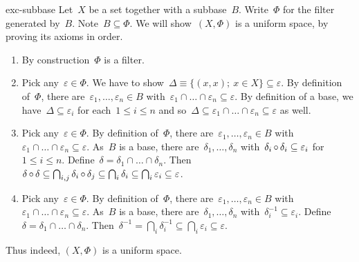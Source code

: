 \begin{solution}{exc-subbase}%
    Let~$X$ be a set together with a subbase~$B$.
    Write~$\Phi$ for the filter generated by~$B$.
    Note~$B \subseteq \Phi$.
    We will show~$(X,\Phi)$ is a uniform space, by proving
        its axioms in order.
\begin{enumerate}
    \item
        By construction~$\Phi$ is a filter.
    \item
        Pick any~$\varepsilon \in \Phi$.
        We have to show~$\Delta\equiv\{(x,x); \ x\in X\} \subseteq \varepsilon$.
        By definition of~$\Phi$, there
        are~$\varepsilon_1, \ldots, \varepsilon_n \in B$
        with~$\varepsilon_1 \cap \ldots \cap \varepsilon_n \subseteq \varepsilon$.
    By definition of a base, we have~$\Delta \subseteq \varepsilon_i$
        for each~$1 \leq i \leq n$
        and so~$\Delta \subseteq \varepsilon_1 \cap \ldots
        \cap \varepsilon_n \subseteq\varepsilon$ as well.
    \item
        Pick any~$\varepsilon \in \Phi$.
    By definition of~$\Phi$, there
        are~$\varepsilon_1, \ldots, \varepsilon_n \in B$
        with~$\varepsilon_1 \cap \ldots \cap
        \varepsilon_n \subseteq \varepsilon$.
    As~$B$ is a base, there are~$\delta_1, \ldots, \delta_n$
     with~$\delta_i \mathop{\circ} \delta_i \subseteq \varepsilon_i$
        for~$1 \leq i \leq n$.
    Define~$\delta = \delta_1 \cap \ldots \cap \delta_n$.
        Then~$\delta \mathop{\circ} \delta
            \subseteq \bigcap_{i,j} \delta_i \mathop{\circ} \delta_j
            \subseteq \bigcap_i \delta_i \subseteq 
            \bigcap_i \varepsilon_i \subseteq \varepsilon$.
\item
        Pick any~$\varepsilon \in \Phi$.
    By definition of~$\Phi$, there
        are~$\varepsilon_1, \ldots, \varepsilon_n \in B$
        with~$\varepsilon_1 \cap \ldots \cap
        \varepsilon_n \subseteq \varepsilon$.
    As~$B$ is a base, there are~$\delta_1, \ldots, \delta_n$
        with~$\delta_i^{-1} \subseteq \varepsilon_i$.
    Define~$\delta = \delta_1 \cap \ldots \cap \delta_n$.
        Then~$\delta^{-1} =
            \bigcap_{i} \delta_i^{-1}  \subseteq
            \bigcap_i \varepsilon_i \subseteq \varepsilon$.
\end{enumerate}
    Thus indeed, $(X, \Phi)$ is a uniform space.
\end{solution}
